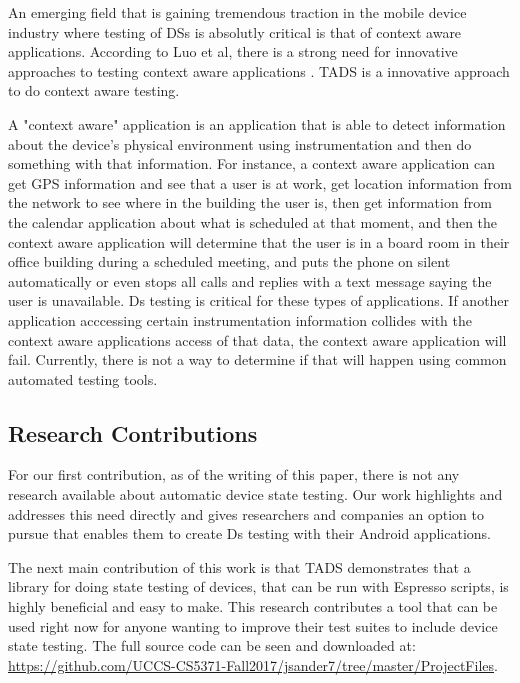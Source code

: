 An emerging field that is gaining tremendous traction in the mobile device industry where testing of DSs is absolutly critical is that of context aware applications.
According to Luo et al, there is a strong need for innovative approaches to testing context aware applications \cite{Luo:2017:TLT:3139486.3130945}. TADS is a innovative approach to do context aware testing. 

A "context aware" application is an application that is able to detect information about the device's physical environment using instrumentation and then do something with that information.  For instance, a context aware application can get GPS information and see that a user is at work, get location information from the network to see where in the building the user is, then get information from the calendar application about what is scheduled at that moment, and then the context aware application will determine that the user is in a board room in their office building during a scheduled meeting, and puts the phone on silent automatically or even stops all calls and replies with a text message saying the user is unavailable. Ds testing is critical for these types of applications.  If another application acccessing certain instrumentation information collides with the context aware applications access of that data, the context aware application will fail. Currently, there is not a way to determine if that will happen using common automated testing tools. 

\subsection{Research Contributions}
For our first contribution, as of the writing of this paper, there is not any research available about automatic device state testing.  Our work highlights and addresses this need directly and gives researchers and companies an option to pursue that enables them to create Ds testing with their Android applications.

The next main contribution of this work is that TADS demonstrates that a library for doing state testing of devices, that can be run with Espresso scripts, is highly beneficial and easy to make.  This research contributes a tool that can be used right now for anyone wanting to improve their test suites to include device state testing. The full source code can be seen and downloaded at: \url{https://github.com/UCCS-CS5371-Fall2017/jsander7/tree/master/ProjectFiles}.

